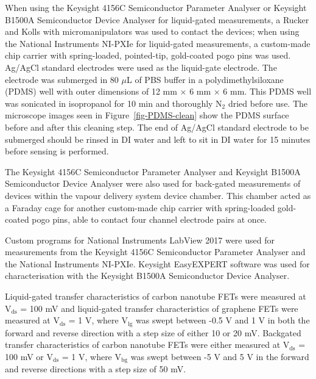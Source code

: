 \documentclass[
  letterpaper,
  DIV=11,
  numbers=noendperiod]{scrartcl}
\begin{document}
When using the Keysight 4156C Semiconductor Parameter Analyser or
Keysight B1500A Semiconductor Device Analyser for liquid-gated
measurements, a Rucker and Kolls with micromanipulators was used to
contact the devices; when using the National Instruments NI-PXIe for
liquid-gated measurements, a custom-made chip carrier with
spring-loaded, pointed-tip, gold-coated pogo pins was used. Ag/AgCl
standard electrodes were used as the liquid-gate electrode. The
electrode was submerged in 80 \(\mu\)L of PBS buffer in a
polydimethylsiloxane (PDMS) well with outer dimensions of 12 mm
\(\times\) 6 mm \(\times\) 6 mm. This PDMS well was sonicated in
isopropanol for 10 min and thoroughly N\(_2\) dried before use. The
microscope images seen in Figure~\ref{fig-PDMS-clean} show the PDMS
surface before and after this cleaning step. The end of Ag/AgCl standard
electrode to be submerged should be rinsed in DI water and left to sit
in DI water for 15 minutes before sensing is performed.

The Keysight 4156C Semiconductor Parameter Analyser and Keysight B1500A
Semiconductor Device Analyser were also used for back-gated measurements
of devices within the vapour delivery system device chamber. This
chamber acted as a Faraday cage for another custom-made chip carrier
with spring-loaded gold-coated pogo pins, able to contact four channel
electrode pairs at once.

Custom programs for National Instruments LabView 2017 were used for
measurements from the Keysight 4156C Semiconductor Parameter Analyser
and the National Instruments NI-PXIe. Keysight EasyEXPERT software was
used for characterisation with the Keysight B1500A Semiconductor Device
Analyser.

Liquid-gated transfer characteristics of carbon nanotube FETs were
measured at V\(_{\mathrm{ds}}\) = 100 mV and liquid-gated transfer
characteristics of graphene FETs were measured at V\(_{\mathrm{ds}}\) =
1 V, where V\(_{\mathrm{lg}}\) was swept between -0.5 V and 1 V in both
the forward and reverse direction with a step size of either 10 or 20
mV. Backgated transfer characteristics of carbon nanotube FETs were
either measured at V\(_{\mathrm{ds}}\) = 100 mV or V\(_{\mathrm{ds}}\) =
1 V, where V\(_{\mathrm{bg}}\) was swept between -5 V and 5 V in the
forward and reverse directions with a step size of 50 mV.
\end{document}
